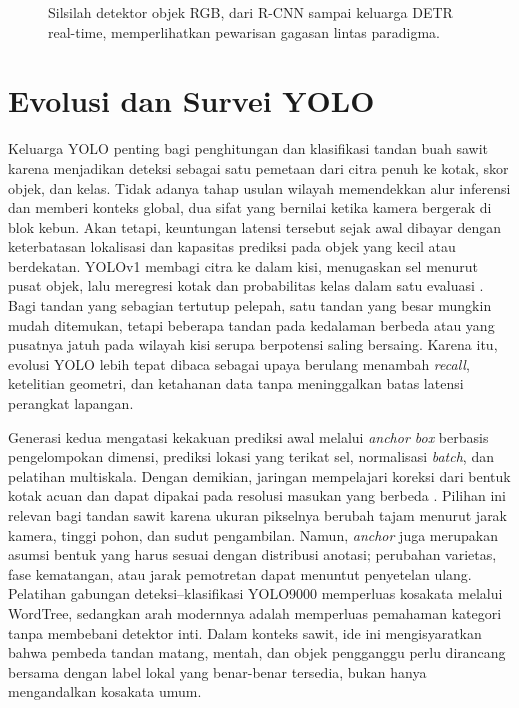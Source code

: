 \begin{figure}[t]
\centering
{}
\caption{Silsilah detektor objek RGB, dari R-CNN sampai keluarga DETR
real-time, memperlihatkan pewarisan gagasan lintas paradigma.}
\label{fig:silsilah}
\end{figure}


\section{Evolusi dan Survei YOLO}\label{sec:yolo}
Keluarga YOLO penting bagi penghitungan dan klasifikasi tandan buah sawit karena menjadikan deteksi sebagai satu pemetaan dari citra penuh ke kotak, skor objek, dan kelas. Tidak adanya tahap usulan wilayah memendekkan alur inferensi dan memberi konteks global, dua sifat yang bernilai ketika kamera bergerak di blok kebun. Akan tetapi, keuntungan latensi tersebut sejak awal dibayar dengan keterbatasan lokalisasi dan kapasitas prediksi pada objek yang kecil atau berdekatan. YOLOv1 membagi citra ke dalam kisi, menugaskan sel menurut pusat objek, lalu meregresi kotak dan probabilitas kelas dalam satu evaluasi \cite{redmon2016yolo}. Bagi tandan yang sebagian tertutup pelepah, satu tandan yang besar mungkin mudah ditemukan, tetapi beberapa tandan pada kedalaman berbeda atau yang pusatnya jatuh pada wilayah kisi serupa berpotensi saling bersaing. Karena itu, evolusi YOLO lebih tepat dibaca sebagai upaya berulang menambah \textit{recall}, ketelitian geometri, dan ketahanan data tanpa meninggalkan batas latensi perangkat lapangan.

Generasi kedua mengatasi kekakuan prediksi awal melalui \textit{anchor box} berbasis pengelompokan dimensi, prediksi lokasi yang terikat sel, normalisasi \textit{batch}, dan pelatihan multiskala. Dengan demikian, jaringan mempelajari koreksi dari bentuk kotak acuan dan dapat dipakai pada resolusi masukan yang berbeda \cite{redmon2017yolo9000}. Pilihan ini relevan bagi tandan sawit karena ukuran pikselnya berubah tajam menurut jarak kamera, tinggi pohon, dan sudut pengambilan. Namun, \textit{anchor} juga merupakan asumsi bentuk yang harus sesuai dengan distribusi anotasi; perubahan varietas, fase kematangan, atau jarak pemotretan dapat menuntut penyetelan ulang. Pelatihan gabungan deteksi--klasifikasi YOLO9000 memperluas kosakata melalui WordTree, sedangkan arah modernnya adalah memperluas pemahaman kategori tanpa membebani detektor inti. Dalam konteks sawit, ide ini mengisyaratkan bahwa pembeda tandan matang, mentah, dan objek pengganggu perlu dirancang bersama dengan label lokal yang benar-benar tersedia, bukan hanya mengandalkan kosakata umum.

